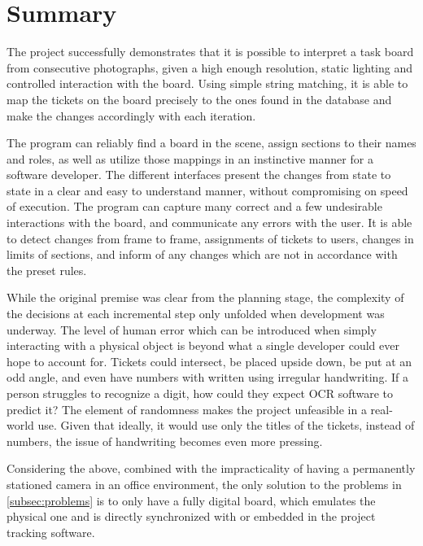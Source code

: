 \documentclass[12pt]{report}
\theoremstyle{definition}
\theoremstyle{remark}
\begin{document}
\section{Summary}
The project successfully demonstrates that it is possible to interpret a task board from consecutive photographs, given a high enough resolution, static lighting and controlled interaction with the board. Using simple string matching, it is able to map the tickets on the board precisely to the ones found in the database and make the changes accordingly with each iteration.

The program can reliably find a board in the scene, assign sections to their names and roles, as well as utilize those mappings in an instinctive manner for a software developer. The different interfaces present the changes from state to state in a clear and easy to understand manner, without compromising on speed of execution. The program can capture many correct and a few undesirable interactions with the board, and communicate any errors with the user. It is able to detect changes from frame to frame, assignments of tickets to users, changes in limits of sections, and inform of any changes which are not in accordance with the preset rules.

While the original premise was clear from the planning stage, the complexity of the decisions at each incremental step only unfolded when development was underway. The level of human error which can be introduced when simply interacting with a physical object is beyond what a single developer could ever hope to account for. Tickets could intersect, be placed upside down, be put at an odd angle, and even have numbers with written using irregular handwriting. If a person struggles to recognize a digit, how could they expect OCR software to predict it? The element of randomness makes the project unfeasible in a real-world use. Given that ideally, it would use only the titles of the tickets, instead of numbers, the issue of handwriting becomes even more pressing.

Considering the above, combined with the impracticality of having a permanently stationed camera in an office environment, the only solution to the problems in \ref{subsec:problems} is to only have a fully digital board, which emulates the physical one and is directly synchronized with or embedded in the project tracking software.



\end{document}
